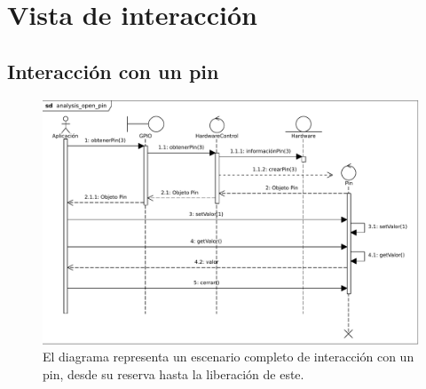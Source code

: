 \documentclass[letterpaper,10pt,spanish]{sphinxmanual}
\begin{document}
\chapter{Vista de interacción}
\label{analysis/interaction::doc}\label{analysis/interaction:vista-de-interaccion}

\section{Interacción con un pin}
\label{analysis/interaction:interaccion-con-un-pin}\begin{figure}[htbp]
\centering
\capstart

\includegraphics{analysis_open_pin.pdf}
\caption{El diagrama representa un escenario completo de interacción con un pin, desde su reserva hasta la liberación de este.}\end{figure}
\end{document}
